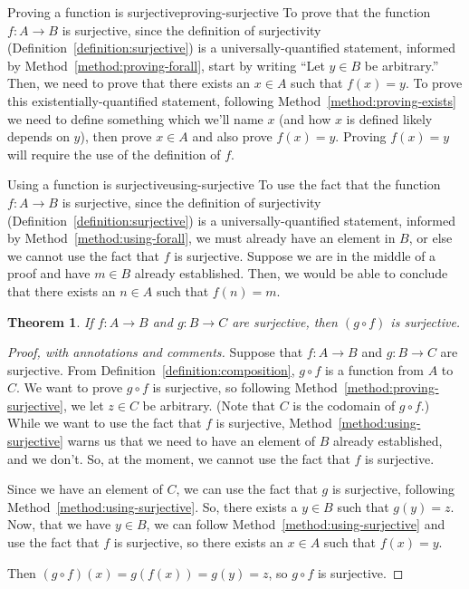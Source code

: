 \documentclass{book}
\newcounter{ekcounter}%
\theoremstyle{ekimcustom}
\newtheorem{theorem}[ekcounter]{Theorem}
\begin{document}
\begin{bmethod}{Proving a function is surjective}{proving-surjective}
To prove that the function $f: A \to B$ is surjective, since the definition of surjectivity (Definition~\ref{definition:surjective}) is a universally-quantified statement, informed by Method~\ref{method:proving-forall}, start by writing ``Let $y \in B$ be arbitrary.'' Then, we need to prove that there exists an $x \in A$ such that $f(x)=y$. To prove this existentially-quantified statement, following Method~\ref{method:proving-exists} we need to define something which we'll name $x$ (and how $x$ is defined likely depends on $y$), then prove $x \in A$ and also prove $f(x)=y$. Proving $f(x)=y$ will require the use of the definition of $f$.
\end{bmethod}
\begin{bmethod}{Using a function is surjective}{using-surjective}
To use the fact that the function $f : A \to B$ is surjective, since the definition of surjectivity (Definition~\ref{definition:surjective}) is a universally-quantified statement, informed by Method~\ref{method:using-forall}, we must already have an element in $B$, or else we cannot use the fact that $f$ is surjective. Suppose we are in the middle of a proof and have $m \in B$ already established. Then, we would be able to conclude that there exists an $n \in A$ such that $f(n)=m$.
\end{bmethod}
\begin{theorem}
If $f : A \to B$ and $g: B \to C$ are surjective, then $(g \circ f)$ is surjective.
\end{theorem}
\begin{proof}[Proof, with annotations and comments]
Suppose that $f : A \to B$ and $g: B \to C$ are surjective. From Definition~\ref{definition:composition}, $g \circ f$ is a function from $A$ to $C$. We want to prove $g \circ f$ is surjective, so following Method~\ref{method:proving-surjective}, we let $z \in C$ be arbitrary. (Note that $C$ is the codomain of $g \circ f$.) While we want to use the fact that $f$ is surjective, Method~\ref{method:using-surjective} warns us that we need to have an element of $B$ already established, and we don't. So, at the moment, we cannot use the fact that $f$ is surjective.

Since we have an element of $C$, we can use the fact that $g$ is surjective, following Method~\ref{method:using-surjective}. So, there exists a $y \in B$ such that $g(y)=z$. Now, that we have $y \in B$, we can follow Method~\ref{method:using-surjective} and use the fact that $f$ is surjective, so there exists an $x \in A$ such that $f(x)=y$.

Then $(g \circ f)(x)= g(f(x))= g(y)=z$, so $g \circ f$ is surjective.
\end{proof}
\end{document}
